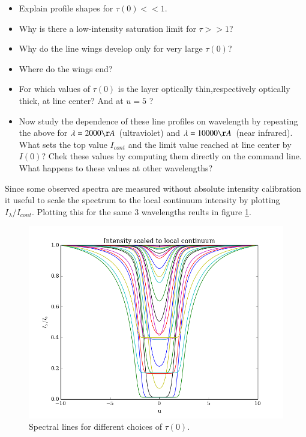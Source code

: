 \documentclass{aa}   %
\begin{document}
\begin{itemize}
 \item 
 Explain profile shapes for $\tau(0) << 1$.
 \item 
 Why is there a low-intensity saturation limit for $\tau >> 1$?
 \item 
 Why do the line wings develop only for very large $\tau(0)$?
 \item 
 Where do the wings end?
 \item 
 For which values of $\tau(0)$ is the layer optically thin,respectively optically thick, at line center?
 And at $u = 5$ ?
 \item
 Now study the dependence of these line profiles on wavelength by repeating the above for $\lambda = 2000 \AA$ (ultraviolet) and $\lambda = 10000 \AA$ (near infrared). What sets the top value $I_{cont}$ and the limit value reached at line center 	by $I(0)$? Chek these values by computing them directly on the command line. What happens to these values at other wavelengths?
\end{itemize}

Since some observed spectra are measured without absolute intensity calibration it useful to scale the spectrum to the local continuum intensity by plotting $I_\lambda/I_{cont}$. Plotting this for the same 3 wavelengths reults in figure \ref{emergent_line_scaled_different}.
\begin{figure}[hbtp]
 \includegraphics[width=.49\textwidth]{emergent_line_scaled_different.png}
 \caption{Spectral lines for different choices of $\tau(0)$.}
 \label{emergent_line_scaled_different} 
\end{figure}
\end{document}
